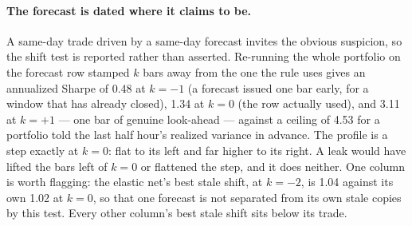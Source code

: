 \paragraph{The forecast is dated where it claims to be.} A same-day trade
driven by a same-day forecast invites the obvious suspicion, so the shift
test is reported rather than asserted. Re-running the whole portfolio on
the forecast row stamped $k$ bars away from the one the rule uses gives an
annualized Sharpe of 0.48 at $k=-1$ (a forecast issued one bar early,
for a window that has already closed), 1.34 at $k=0$ (the row actually
used), and 3.11 at $k=+1$ --- one bar of genuine look-ahead ---
against a ceiling of 4.53 for a portfolio told the last half hour's realized
variance in
advance. The profile is a step exactly at $k=0$: flat to its left and far
higher to its right. A leak would have lifted the bars left of $k=0$ or
flattened the step, and it does neither. One column is worth flagging: the
elastic net's best stale shift, at $k=-2$, is 1.04 against its own
1.02 at $k=0$, so that one forecast is not separated from its own stale
copies by this test. Every other column's best stale shift sits below its
trade.

\iffalse
